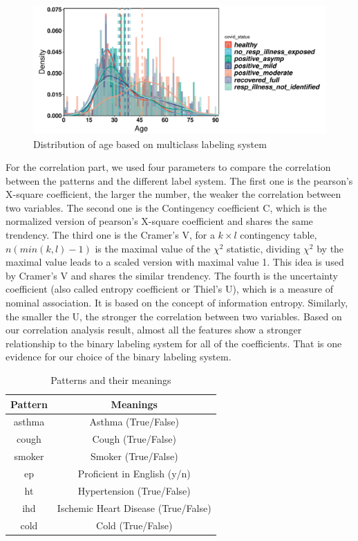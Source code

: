 \documentclass[11pt]{article}
\begin{document}
\begin{figure}[htbp]{}
	\centering
    \includegraphics[width=.8\textwidth]{./imgs/distri_status_age.pdf} %
    \caption{Distribution of age based on multiclass labeling system}
    \label{fig:distri_status_age}
\end{figure}

For the correlation part, we used four parameters to compare the correlation between the patterns and the different label system. The first one is the pearson’s X-square coefficient, the larger the number, the weaker the correlation between two variables.  The second one is the Contingency coefficient C, which is the normalized version of pearson’s X-square coefficient and shares the same trendency. The third one is the Cramer’s V, for a $k \times l$ contingency table, $n(min(k,l)-1)$ is the maximal value of the $\chi^2$ statistic, dividing $\chi^2$ by the maximal value leads to a scaled version with maximal value 1. This idea is used by Cramer’s V and shares the similar trendency. The fourth is the uncertainty coefficient (also called entropy coefficient or Thiel’s U), which is a measure of nominal association. It is based on the concept of information entropy. Similarly, the smaller the U, the stronger the correlation between two variables. Based on our correlation analysis result, almost all the features show a stronger relationship to the binary labeling system for all of the coefficients. That is one evidence for our choice of the binary labeling system.

\begin{table}
	\centering
	\begin{tabular}[!htbp]{|c|c|}
	\hline
	Pattern & Meanings\\
	\hline
	asthma & Asthma (True/False)\\
	\hline
	cough & Cough (True/False)\\
	\hline
	smoker & Smoker (True/False)\\
	\hline
	ep & Proficient in English (y/n)\\
	\hline
	ht & Hypertension  (True/False)\\
	\hline
	ihd & Ischemic Heart Disease (True/False)\\
	\hline
	cold & Cold (True/False)\\
	\hline
	\end{tabular}
	\caption{Patterns and their meanings}
\end{table}
\end{document}

